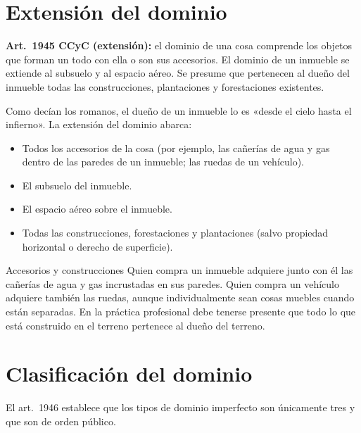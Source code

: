 \documentclass[12pt,oneside]{book}
\begin{document}
\section{Extensión del dominio}

\textbf{Art.~1945 CCyC (extensión):} el dominio de una cosa comprende los objetos que forman un todo con ella o son sus accesorios. El dominio de un inmueble se extiende al subsuelo y al espacio aéreo. Se presume que pertenecen al dueño del inmueble todas las construcciones, plantaciones y forestaciones existentes.

Como decían los romanos, el dueño de un inmueble lo es «desde el cielo hasta el infierno». La extensión del dominio abarca:

\begin{itemize}
    \item Todos los accesorios de la cosa (por ejemplo, las cañerías de agua y gas dentro de las paredes de un inmueble; las ruedas de un vehículo).
    \item El subsuelo del inmueble.
    \item El espacio aéreo sobre el inmueble.
    \item Todas las construcciones, forestaciones y plantaciones (salvo propiedad horizontal o derecho de superficie).
\end{itemize}

\begin{example}{Accesorios y construcciones}
Quien compra un inmueble adquiere junto con él las cañerías de agua y gas incrustadas en sus paredes. Quien compra un vehículo adquiere también las ruedas, aunque individualmente sean cosas muebles cuando están separadas. En la práctica profesional debe tenerse presente que todo lo que está construido en el terreno pertenece al dueño del terreno.
\end{example}

\section{Clasificación del dominio}

El art.~1946 establece que los tipos de dominio imperfecto son únicamente tres y que son de orden público.
\end{document}
